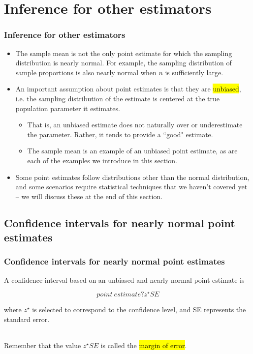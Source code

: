 
\section{Inference for other estimators}


\begin{frame}
\frametitle{Inference for other estimators}

\begin{itemize}

\item The sample mean is not the only point estimate for which the sampling distribution is nearly normal. For example, the sampling distribution of sample proportions is also nearly normal when $n$ is sufficiently large.

\item An important assumption about point estimates is that they are \hl{unbiased}, i.e. the sampling distribution of the estimate is centered at the true population parameter it estimates. 
\begin{itemize}
\item That is, an unbiased estimate does not naturally over or underestimate the parameter. Rather, it tends to provide a ``good" estimate. 
\item The sample mean is an example of an unbiased point estimate, as are each of the examples we introduce in this section.
\end{itemize}

\item Some point estimates follow distributions other than the normal distribution, and some scenarios require statistical techniques that we haven't covered yet -- we will discuss these at the end of this section.

\end{itemize}

\end{frame}


\subsection{Confidence intervals for nearly normal point estimates}


\begin{frame}
\frametitle{Confidence intervals for nearly normal point estimates}

A confidence interval based on an unbiased and nearly normal point estimate is

\[ point~estimate ? z^\star SE \]

where $z^\star$ is selected to correspond to the confidence level, and SE represents the standard error. 

$\:$ \\

Remember that the value $z^\star SE$ is called the \hl{margin of error}.

\end{frame}

